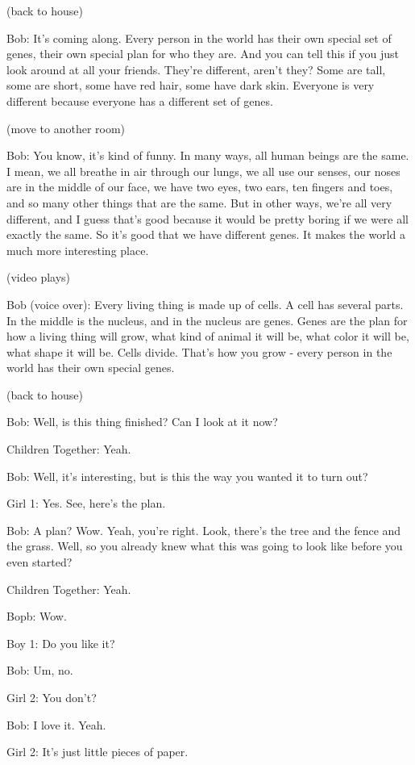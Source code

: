 (back to house)

Bob: It's coming along. Every person in the world has their own special set of genes, their own special plan for who they are. And you can tell this if you just look around at all your friends. They're different, aren't they? Some are tall, some are short, some have red hair, some have dark skin. Everyone is very different because everyone has a different set of genes.

(move to another room)

Bob: You know, it's kind of funny. In many ways, all human beings are the same. I mean, we all breathe in air through our lungs, we all use our senses, our noses are in the middle of our face, we have two eyes, two ears, ten fingers and toes, and so many other things that are the same. But in other ways, we're all very different, and I guess that's good because it would be pretty boring if we were all exactly the same. So it's good that we have different genes. It makes the world a much more interesting place.

(video plays)

Bob (voice over): Every living thing is made up of cells. A cell has several parts. In the middle is the nucleus, and in the nucleus are genes. Genes are the plan for how a living thing will grow, what kind of animal it will be, what color it will be, what shape it will be. Cells divide. That's how you grow - every person in the world has their own special genes.

(back to house)

Bob: Well, is this thing finished? Can I look at it now?

Children Together: Yeah.

Bob: Well, it's interesting, but is this the way you wanted it to turn out?

Girl 1: Yes. See, here's the plan.

Bob: A plan? Wow. Yeah, you're right. Look, there's the tree and the fence and the grass. Well, so you already knew what this was going to look like before you even started?

Children Together: Yeah.

Bopb: Wow.

Boy 1: Do you like it?

Bob: Um, no.

Girl 2: You don't?

Bob: I love it. Yeah.

Girl 2: It's just little pieces of paper.

